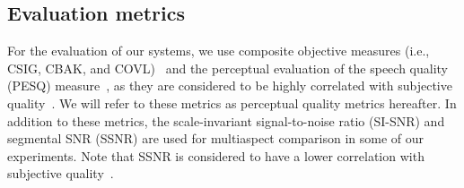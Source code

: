 \documentclass[a4paper]{article}
\begin{document}
\begin{spacing}{0.9}
\subsection{Evaluation metrics}
For the evaluation of our systems, we use composite objective measures (i.e., CSIG, CBAK, and COVL)~\cite{hu2007evaluation} and 
the perceptual evaluation of the speech quality (PESQ) measure~\cite{rix2001perceptual}, as they are considered to be highly correlated with subjective quality~\cite{hu2007evaluation}.
We will refer to these metrics as perceptual quality metrics hereafter.
In addition to these metrics, the scale-invariant signal-to-noise ratio (SI-SNR) and segmental SNR (SSNR) are used for multiaspect comparison in some of our experiments.
Note that SSNR is considered to have a lower correlation with subjective quality~\cite{hu2007evaluation}.

\end{spacing}
\end{document}
